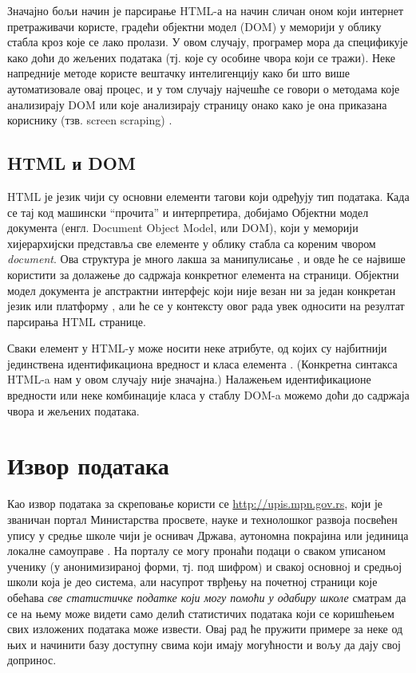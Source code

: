 Значајно бољи начин је парсирање HTML-а на начин сличан оном који интернет претраживачи користе, градећи објектни модел (DOM) у меморији у облику стабла кроз које се лако пролази. У овом случају, програмер мора да спецификује како доћи до жељених података (тј. које су особине чвора који се тражи). Неке напредније методе користе вештачку интелигенцију како би што више аутоматизовале овај процес, и у том случају најчешће се говори о методама које анализирају DOM \citep{peters2013content} или које анализирају страницу онако како је она приказана кориснику (тзв. screen scraping) \citep{awsdiffbot}.

\subsection{HTML и DOM}

HTML је језик чији су основни елементи тагови који одређују тип података. Када се тај код машински \enquote{прочита} и интерпретира, добијамо Објектни модел документа (енгл. Document Object Model, или DOM), који у меморији хијерархијски представља све елементе у облику стабла са кореним чвором \emph{document}. Ова структура је много лакша за манипулисање \citep{gupta2003dom}, и овде ће се највише користити за долажење до садржаја конкретног елемента на страници. Објектни модел документа је апстрактни интерфејс који није везан ни за један конкретан језик или платформу \citep{w3domdef}, али ће се у контексту овог рада увек односити на резултат парсирања HTML странице. 

Сваки елемент у HTML-у може носити неке атрибуте, од којих су најбитнији јединствена идентификациона вредност  и класа елемента . (Конкретна синтакса HTML-a нам у овом случају није значајна.) Налажењем идентификационе вредности или неке комбинације класа у стаблу DOM-a можемо доћи до садржаја чвора и жељених података.


\section{Извор података}

Као извор података за скреповање користи се \url{http://upis.mpn.gov.rs}, који је званичан портал Министарства просвете, науке и технолошког развоја посвећен упису у средње школе чији је оснивач Држава, аутономна покрајина или јединица локалне самоуправе \citep{upismpn}. На порталу се могу пронаћи подаци о сваком уписаном ученику (у анонимизираној форми, тј. под шифром) и свакој основној и средњој школи која је део система, али насупрот тврђењу на почетној страници које обећава \emph{све статистичке податке који могу помоћи у одабиру школе} \citep{upismpn} сматрам да се на њему може видети само делић статистичих података који се коришћењем свих изложених података може извести. Овај рад ће пружити примере за неке од њих и начинити базу доступну свима који имају могућности и вољу да дају свој допринос.

